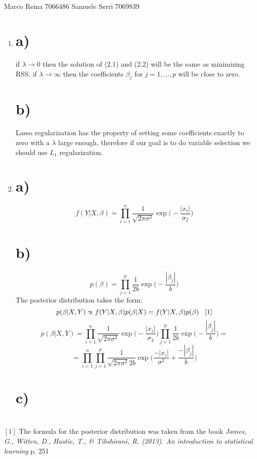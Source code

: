 \documentclass[12pt]{article}
\begin{document}
\section*{}
Marco Reina 7066486 \newline
Samuele Serri 7069839 \newline
\begin{enumerate}
    \item


\section*{a)}
if $\lambda\xrightarrow{}0$ then the solution of (2.1) and (2.2) will be the same as minimizing RSS. \newline
if $\lambda \xrightarrow{}\infty$ then the coefficients $\beta_j$ for $j = 1,...,p$ will be close to zero.
\section*{b)}
Lasso regularization has the property of setting some coefficients exactly to zero with a $\lambda$ large enough, therefore if our goal is to do variable selection we should use $L_1$ regularization.  





\item
\section*{a)}
\begin{equation*}
    f(Y| X, \beta) = \prod_{i  =1}^n\frac{1}{\sqrt{2\pi\sigma^2}}\exp\bigg(-\frac{|x_i|}{\sigma_2}\bigg)
\end{equation*}
\section*{b)}
\begin{equation*}
    p(\beta) = \prod_{j = 1}^{p}\frac{1}{2b}\exp\bigg(-\frac{|\beta_j|}{b}\bigg)
\end{equation*}
The posterior distribution takes the form: \begin{equation*}
    p(\beta| X, Y) \propto f(Y| X, \beta)p(\beta|X) = f(Y|X,\beta)p(\beta) \hspace{0.3 cm} [1]
\end{equation*}
\begin{equation*}
    p(\beta| X, Y) = \prod_{i  =1}^n\frac{1}{\sqrt{2\pi\sigma^2}}\exp\bigg(-\frac{|x_i|}{\sigma_2}\bigg)\prod_{j = 1}^{p}\frac{1}{2b}\exp\bigg(-\frac{|\beta_j|}{b}\bigg) = 
\end{equation*}
\begin{equation*}
    = \prod_{i = 1}^n\prod_{j  =1}^p\frac{1}{\sqrt{2\pi\sigma^2}2b}\exp\bigg(\frac{-|x_i|}{\sigma^2} + \frac{-|\beta_j|}{b}\bigg)
\end{equation*}
\section*{c)}
\end{enumerate}
\section*{}
$[1]$ The formula for the posterior distribution was taken from the book \textit{James, G., Witten, D., Hastie, T., \& Tibshirani, R. (2013). An introduction to statistical learning} p. 251
\end{document}
